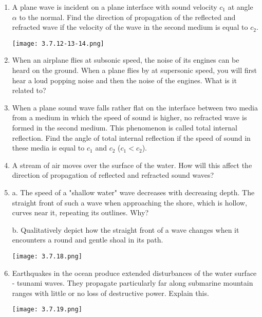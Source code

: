 \documentclass{article}
\begin{document}
\begin{enumerate}[label=3.7.\arabic*]
\item A plane wave is incident on a plane interface with sound velocity $c_1$ at angle $\alpha$ to the normal. Find the direction of propagation of the reflected and refracted wave if the velocity of the wave in the second medium is equal to $c_2$.


\begin{center}
    \texttt{[image: 3.7.12-13-14.png]}
\end{center}

\item When an airplane flies at subsonic speed, the noise of its engines can be heard on the ground. When a plane flies by at supersonic speed, you will first hear a loud popping noise and then the noise of the engines. What is it related to?

\item When a plane sound wave falls rather flat on the interface between two media from a medium in which the speed of sound is higher, no refracted wave is formed in the second medium. This phenomenon is called total internal reflection. Find the angle of total internal reflection if the speed of sound in these media is equal to $c_1$ and $c_2$ ($c_1 < c_2$).

\item A stream of air moves over the surface of the water. How will this affect the direction of propagation of reflected and refracted sound waves?

\item a. The speed of a "shallow water" wave decreases with decreasing depth. The straight front of such a wave when approaching the shore, which is hollow, curves near it, repeating its outlines. Why? 

b. Qualitatively depict how the straight front of a wave changes when it encounters a round and gentle shoal in its path.

\begin{center}
    \texttt{[image: 3.7.18.png]}
\end{center}

\item Earthquakes in the ocean produce extended disturbances of the water surface - tsunami waves. They propagate particularly far along submarine mountain ranges with little or no loss of destructive power. Explain this.

\begin{center}
    \texttt{[image: 3.7.19.png]}
\end{center}


\end{enumerate}
\end{document}
